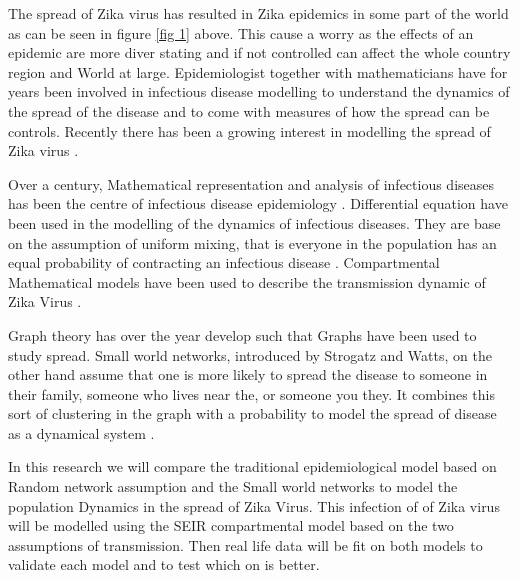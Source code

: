 The spread of Zika virus has resulted in Zika epidemics in some part of the world as can be seen in figure \ref{fig 1} above. This cause a worry as the effects of an epidemic are more diver stating and if not controlled can affect the whole country region and World at large. Epidemiologist together with mathematicians have for years been involved in infectious disease modelling to understand the dynamics of the spread of the disease and to come with measures of how the spread can be controls. Recently there has been a growing interest in modelling the spread of Zika virus \citep{ku2016}.

Over a  century, Mathematical representation and analysis of infectious diseases has been the centre of  infectious disease epidemiology \citep{b2005}. Differential equation have been used in the modelling of the dynamics of infectious diseases. They are base on the assumption of uniform mixing, that is everyone in the population has an equal probability of contracting an infectious disease \citep{kaplanemergency2002}.
Compartmental Mathematical models have been used to describe the transmission dynamic of Zika Virus \citep{gao2016}.

Graph theory has over the year develop such that Graphs have been used to study spread.  Small world networks, introduced by Strogatz and Watts, on the other
hand assume that one is more likely to spread the disease to someone in their family, someone
who lives near the, or someone you they. It combines this sort of clustering in the graph with a probability to model the spread of disease as a dynamical system \citep{newman2001random}.


In this research we will compare the traditional epidemiological model based on Random network assumption and the Small world networks to model the population Dynamics in the spread of Zika Virus. This infection of of Zika virus will be modelled using the SEIR compartmental model based on the two assumptions of transmission. Then real life data will be fit on both models to validate each model and to test which on is better.

